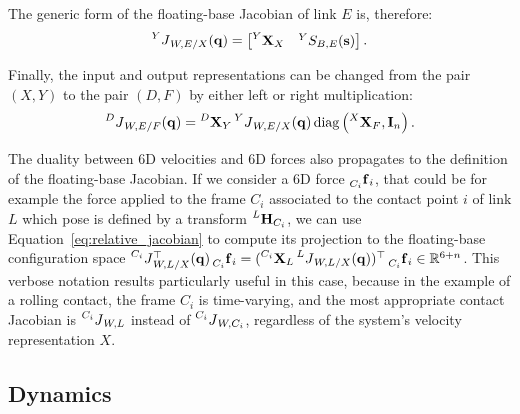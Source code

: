 \begin{definition*}
\label{definition:link_jacobian}
%
The generic form of the floating-base Jacobian of link $E$ is, therefore:
\begin{equation}
    \label{eq:relative_jacobian}
    \jac[Y]_{W,E/X}(\Qu) =
    \begin{bmatrix}
        \transvel[Y]_X & {}^Y S_{B,E}(\Shape)
    \end{bmatrix}
.
\end{equation}
%
\end{definition*}

Finally, the input and output representations can be changed from the pair $(X, Y)$ to the pair $(D, F)$ by either left or right multiplication:
%
\begin{equation}
    \label{eq:jacobian_change_of_representation}
    \jac[D]_{W,E/F}(\Qu) = \transvel[D]_Y \jac[Y]_{W,E/X}(\Qu) \operatorname{diag}\left(\transvel[X]_F, \eye_n \right)
    .
\end{equation}

\begin{remark}
\label{remark:jacobian_and_6d_forces}
%
The duality between 6D velocities and 6D forces also propagates to the definition of the floating-base Jacobian.
If we consider a 6D force $\forcesix[C_i]_i$, that could be for example the force applied to the frame $C_i$ associated to the contact point $i$ of link $L$ which pose is defined by a transform $\homo[L]_{C_i}$, we can use Equation~\eqref{eq:relative_jacobian} to compute its projection to the floating-base configuration space $\jac[C_i]_{W,L/X}^\top(\Qu) \forcesix[C_i]_i = (\transvel[C_i]_L \jac[L]_{W,L/X}(\Qu))^\top \forcesix[C_i]_i \in \realn^{6+n}$.
This verbose notation results particularly useful in this case, because in the example of a rolling contact, the frame $C_i$ is time-varying, and the most appropriate contact Jacobian is $\jac[C_i]_{W,L}$ instead of $\jac[C_i]_{W, C_i}$, regardless of the system's velocity representation $X$.
%
\end{remark}

\subsection{Dynamics}
\label{sec:multibody_dynamics}

